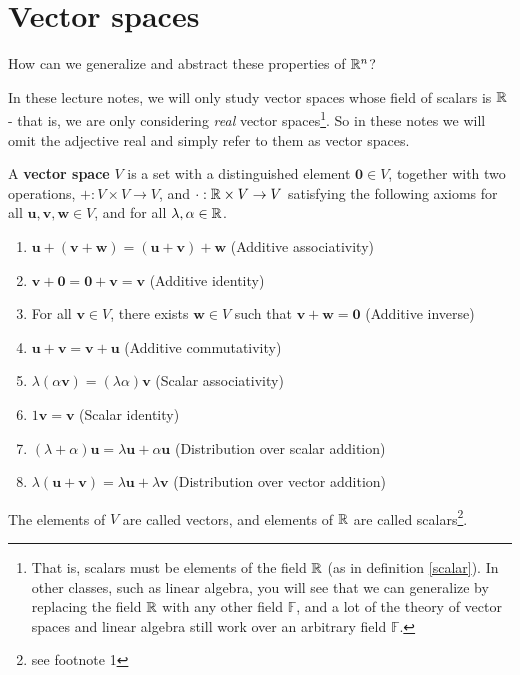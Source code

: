 \section{Vector spaces}

\begin{motivating}
How can we generalize and abstract these properties of $\mathbb{R}^n$?
\end{motivating}

In these lecture notes, we will only study vector spaces whose field of scalars is $\mathbb{R}$ - that is, we are only considering \textit{real} vector spaces\footnote{That is, scalars must be elements of the field $\mathbb{R}$ (as in definition \ref{scalar}).  In other classes, such as linear algebra, you will see that we can generalize by replacing the field $\mathbb{R}$ with any other field $\mathbb{F}$, and a lot of the theory of vector spaces and linear algebra still work over an arbitrary field $\mathbb{F}$.}.  So in these notes we will omit the adjective real and simply refer to them as vector spaces.

    \begin{definition}\label{vspaceaxioms}
    A \textbf{vector space} $V$ is a set with a distinguished element $\bm{0} \in V$, together with two operations, $+ : V \times V \to V$, and $\cdot : \mathbb{R} \times V \to V$ satisfying the following axioms for all $\bm{u}, \bm{v}, \bm{w} \in V$, and for all $\lambda, \alpha \in \mathbb{R}$.
    
    
     \begin{enumerate}[label=(\roman*)]
        \item $\bm{u} + (\bm{v} + \bm{w}) = (\bm{u} + \bm{v}) + \bm{w} $ (Additive associativity)
        \item $\bm{v} + \bm{0} = \bm{0} + \bm{v} = \bm{v}$ (Additive identity)
        \item For all $\bm{v} \in V$, there exists $\bm{w} \in V$ such that $\bm{v} + \bm{w} = \bm{0}$ (Additive inverse)
        \item $\bm{u} + \bm{v} = \bm{v} + \bm{u}$ (Additive commutativity)
        \item $\lambda (\alpha \bm{v}) = (\lambda\alpha)\bm{v}$ (Scalar associativity)
        \item $1\bm{v} = \bm{v}$ (Scalar identity)
        \item $(\lambda+\alpha)\bm{u} = \lambda\bm{u} +  \alpha\bm{u}$ (Distribution over scalar addition)
        \item $\lambda(\bm{u} + \bm{v}) = \lambda\bm{u} + \lambda\bm{v}$ (Distribution over vector addition)
    \end{enumerate}
    
    The elements of $V$ are called vectors, and elements of $\mathbb{R}$ are called scalars\footnote{see footnote 1}.
    \end{definition}
    
